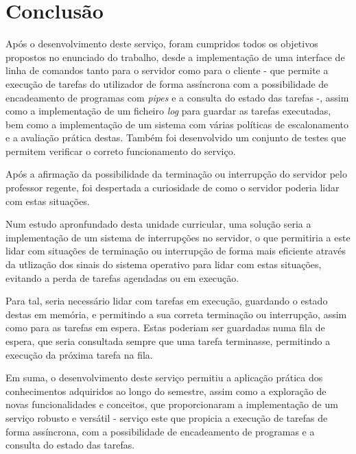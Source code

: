 \documentclass[a4paper,11pt]{scrreprt}
\begin{document}
\chapter{Conclusão}
    Após o desenvolvimento deste serviço, foram cumpridos todos
    os objetivos propostos no enunciado do trabalho, desde a implementação de
    uma interface de linha de comandos tanto para o servidor como para o cliente -
    que permite a execução de tarefas do utilizador de forma assíncrona com a
    possibilidade de encadeamento de programas com \textit{pipes} e a
    consulta do estado das tarefas -, assim como a implementação de um ficheiro
    \textit{log} para guardar as tarefas executadas, bem como a implementação de um
    sistema com várias políticas de escalonamento e a avaliação prática destas.
    Também foi desenvolvido um conjunto de testes que permitem verificar o correto
    funcionamento do serviço.

    Após a afirmação da possibilidade da terminação ou interrupção do servidor
    pelo professor regente, foi despertada a curiosidade de como o servidor
    poderia lidar com estas situações.

    Num estudo apronfundado desta unidade curricular, uma solução seria a
    implementação de um sistema de interrupções no servidor, o que permitiria
    a este lidar com situações de terminação ou interrupção de forma mais
    eficiente através da utlização dos sinais do sistema operativo para lidar com estas
    situações, evitando a perda de tarefas agendadas ou em execução.

    Para tal, seria necessário lidar com tarefas em execução, guardando
    o estado destas em memória, e permitindo a sua correta terminação
    ou interrupção, assim como para as tarefas em espera. Estas poderiam
    ser guardadas numa fila de espera, que seria consultada sempre que
    uma tarefa terminasse, permitindo a execução da próxima tarefa na
    fila.

    Em suma, o desenvolvimento deste serviço permitiu a aplicação prática
    dos conhecimentos adquiridos ao longo do semestre, assim como a
    exploração de novas funcionalidades e conceitos, que proporcionaram
    a implementação de um serviço robusto e versátil - serviço este que 
    propicia a execução de tarefas de forma assíncrona, com a possibilidade de
    encadeamento de programas e a consulta do estado das tarefas.

\end{document}
